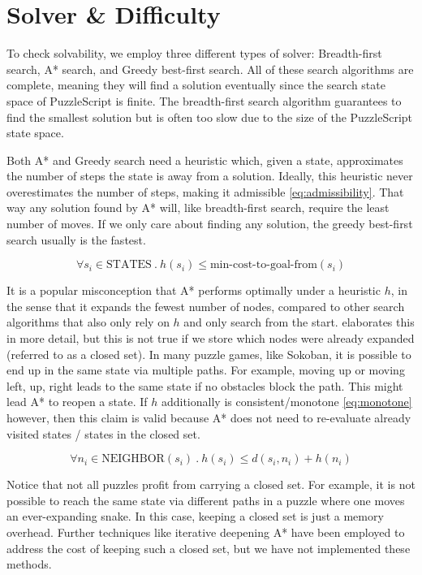 \section{Solver \& Difficulty}
To check solvability, we employ three different types of solver: Breadth-first search, A* search, and Greedy best-first search. All of these search algorithms are complete, meaning they will find a solution eventually since the search state space of PuzzleScript is finite. The breadth-first search algorithm guarantees to find the smallest solution but is often too slow due to the size of the PuzzleScript state space.

Both A* and Greedy search need a heuristic which, given a state, approximates the number of steps the state is away from a solution. Ideally, this heuristic never overestimates the number of steps, making it admissible \ref{eq:admissibility}. That way any solution found by A* will, like breadth-first search, require the least number of moves. If we only care about finding any solution, the greedy best-first search usually is the fastest.

\begin{equation}
\label{eq:admissibility}
\forall s_i \in \text{STATES} \: . \: h(s_i) \leq \text{min-cost-to-goal-from}(s_i)
\end{equation}

It is a popular misconception that A* performs optimally under a heuristic $h$, in the sense that it expands the fewest number of nodes, compared to other search algorithms that also only rely on $h$ and only search from the start. \cite{Holte2010} elaborates this in more detail, but this is not true if we store which nodes were already expanded (referred to as a closed set). In many puzzle games, like Sokoban, it is possible to end up in the same state via multiple paths. For example, moving up or moving left, up, right leads to the same state if no obstacles block the path. This might lead A* to reopen a state.
If $h$ additionally is consistent/monotone \ref{eq:monotone} however, then this claim is valid because A* does not need to re-evaluate already visited states / states in the closed set.     

\begin{equation}
\label{eq:monotone}
\forall n_i \in \text{NEIGHBOR}(s_i) \: . \: h(s_i) \leq d(s_i, n_i) + h(n_i)
\end{equation}

Notice that not all puzzles profit from carrying a closed set. For example, it is not possible to reach the same state via different paths in a puzzle where one moves an ever-expanding snake. In this case, keeping a closed set is just a memory overhead.
Further techniques like iterative deepening A* have been employed to address the cost of keeping such a closed set, but we have not implemented these methods.


